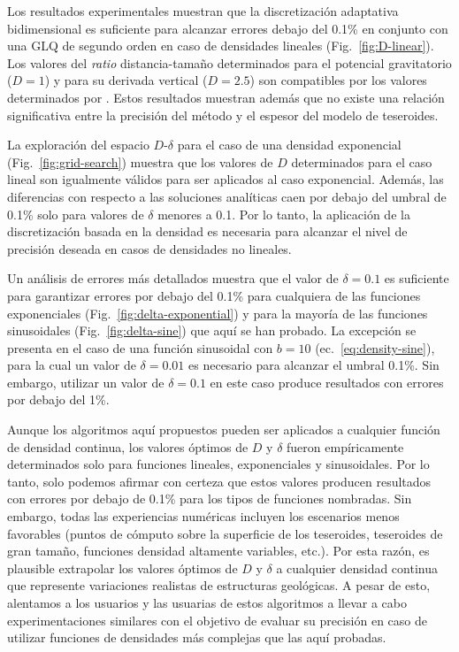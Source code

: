 Los resultados experimentales muestran que la discretización adaptativa
bidimensional es suficiente para alcanzar errores debajo del 0.1\% en conjunto
con una \ac{GLQ} de segundo orden en caso de densidades lineales
(Fig.~\ref{fig:D-linear}).
Los valores del \emph{ratio} distancia-tamaño determinados para el potencial
gravitatorio ($D=1$) y para su derivada vertical ($D=2.5$) son compatibles por
los valores determinados por \citet{uieda2016}.
Estos resultados muestran además que no existe una relación significativa entre
la precisión del método y el espesor del modelo de teseroides.

La exploración del espacio $D$-$\delta$ para el caso de una densidad
exponencial (Fig.~\ref{fig:grid-search}) muestra que los valores de $D$
determinados para el caso lineal son igualmente válidos para ser aplicados al
caso exponencial.
Además, las diferencias con respecto a las soluciones analíticas caen por
debajo del umbral de 0.1\% solo para valores de $\delta$ menores a 0.1.
Por lo tanto, la aplicación de la discretización basada en la densidad es
necesaria para alcanzar el nivel de precisión deseada en casos de
densidades no lineales.

Un análisis de errores más detallados muestra que el valor de $\delta = 0.1$ es
suficiente para garantizar errores por debajo del 0.1\% para cualquiera de las
funciones exponenciales (Fig.~\ref{fig:delta-exponential}) y para la mayoría de
las funciones sinusoidales (Fig.~\ref{fig:delta-sine}) que aquí se han probado.
La excepción se presenta en el caso de una función sinusoidal con $b = 10$
(ec.~\ref{eq:density-sine}),
para la cual un valor de $\delta = 0.01$ es necesario para alcanzar el umbral
0.1\%.
Sin embargo, utilizar un valor de $\delta = 0.1$ en este caso produce
resultados con errores por debajo del 1\%.

Aunque los algoritmos aquí propuestos pueden ser aplicados a cualquier función
de densidad continua, los valores óptimos de $D$ y $\delta$ fueron
empíricamente determinados solo para funciones lineales, exponenciales
y sinusoidales.
Por lo tanto, solo podemos afirmar con certeza que estos valores producen
resultados con errores por debajo de 0.1\% para los tipos de funciones
nombradas.
Sin embargo, todas las experiencias numéricas incluyen los escenarios menos
favorables (puntos de cómputo sobre la superficie de los teseroides,
teseroides de gran tamaño, funciones densidad altamente variables, etc.).
Por esta razón, es plausible extrapolar los valores óptimos de $D$ y $\delta$
a cualquier densidad continua que represente variaciones realistas de
estructuras geológicas.
A pesar de esto, alentamos a los usuarios y las usuarias de estos algoritmos
a llevar a cabo experimentaciones similares con el objetivo de evaluar su
precisión en caso de utilizar funciones de densidades más complejas que las
aquí probadas.

